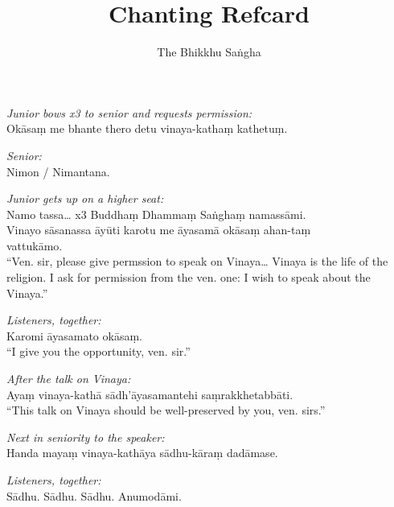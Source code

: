 \documentclass[10pt,oneside]{memoir}
\title{Chanting Refcard}
\author{The Bhikkhu Saṅgha}
\begin{document}
\begin{hangparas}{1em}{1}

\emph{Junior bows x3 to senior and requests permission:}\\
Okāsaṃ me bhante thero detu vinaya-kathaṃ kathetuṃ.

\emph{Senior:}\\
Nimon / Nimantana.

\emph{Junior gets up on a higher seat:}\\
Namo tassa\ldots{} x3 Buddhaṃ Dhammaṃ Saṅghaṃ namassāmi.\\
Vinayo sāsanassa āyūti karotu me āyasamā okāsaṃ ahan-taṃ\\ vattukāmo.\\[5pt]
``Ven. sir, please give permssion to speak on Vinaya\ldots{} Vinaya is the
life of the religion. I ask for permission from the ven. one: I wish
to speak about the Vinaya.''

\emph{Listeners, together:}\\
Karomi āyasamato okāsaṃ.\\[5pt]
``I give you the opportunity, ven. sir.''

\emph{After the talk on Vinaya:}\\
Ayaṃ vinaya-kathā sādh'āyasamantehi saṃrakkhetabbāti.\\[5pt]
``This talk on Vinaya should be well-preserved by you, ven. sirs.''

\emph{Next in seniority to the speaker:}\\
Handa mayaṃ vinaya-kathāya sādhu-kāraṃ dadāmase.

\emph{Listeners, together:}\\
Sādhu. Sādhu. Sādhu. Anumodāmi.

\end{hangparas}
\end{document}
